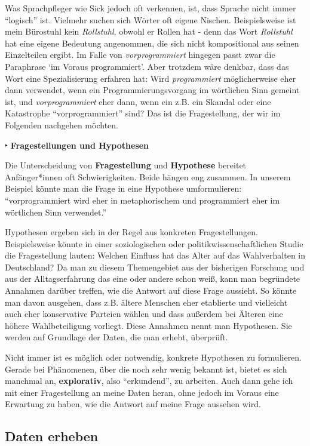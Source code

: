 \documentclass[]{article}
\begin{document}
Was Sprachpfleger wie Sick jedoch oft verkennen, ist, dass Sprache nicht
immer ``logisch'' ist. Vielmehr suchen sich Wörter oft eigene Nischen.
Beispielsweise ist mein Bürostuhl kein \emph{Rollstuhl}, obwohl er
Rollen hat - denn das Wort \emph{Rollstuhl} hat eine eigene Bedeutung
angenommen, die sich nicht kompositional aus seinen Einzelteilen ergibt.
Im Falle von \emph{vorprogrammiert} hingegen passt zwar die Paraphrase
`im Voraus programmiert'. Aber trotzdem wäre denkbar, dass das Wort eine
Spezialisierung erfahren hat: Wird \emph{programmiert} möglicherweise
eher dann verwendet, wenn ein Programmierungsvorgang im wörtlichen Sinn
gemeint ist, und \emph{vorprogrammiert} eher dann, wenn ein z.B. ein
Skandal oder eine Katastrophe ``vorprogrammiert'' sind? Das ist die
Fragestellung, der wir im Folgenden nachgehen möchten.

 ‣ \textbf{Fragestellungen und Hypothesen}

Die Unterscheidung von \textbf{Fragestellung} und \textbf{Hypothese}
bereitet Anfänger*innen oft Schwierigkeiten. Beide hängen eng zusammen.
In unserem Beispiel könnte man die Frage in eine Hypothese
umformulieren: ``vorprogrammiert wird eher in metaphorischem und
programmiert eher im wörtlichen Sinn verwendet.''

Hypothesen ergeben sich in der Regel aus konkreten Fragestellungen.
Beispielsweise könnte in einer soziologischen oder
politikwissenschaftlichen Studie die Fragestellung lauten: Welchen
Einfluss hat das Alter auf das Wahlverhalten in Deutschland? Da man zu
diesem Themengebiet aus der bisherigen Forschung und aus der
Alltagserfahrung das eine oder andere schon weiß, kann man begründete
Annahmen darüber treffen, wie die Antwort auf diese Frage aussieht. So
könnte man davon ausgehen, dass z.B. ältere Menschen eher etablierte und
vielleicht auch eher konservative Parteien wählen und dass außerdem bei
Älteren eine höhere Wahlbeteiligung vorliegt. Diese Annahmen nennt man
Hypothesen. Sie werden auf Grundlage der Daten, die man erhebt,
überprüft.

Nicht immer ist es möglich oder notwendig, konkrete Hypothesen zu
formulieren. Gerade bei Phänomenen, über die noch sehr wenig bekannt
ist, bietet es sich manchmal an, \textbf{explorativ}, also
``erkundend'', zu arbeiten. Auch dann gehe ich mit einer Fragestellung
an meine Daten heran, ohne jedoch im Voraus eine Erwartung zu haben, wie
die Antwort auf meine Frage aussehen wird.

\subsection{Daten erheben}\label{daten-erheben}
\end{document}

